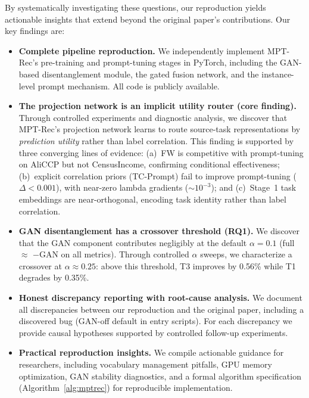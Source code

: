 \documentclass[review,anonymous]{acmart}
\begin{document}
By systematically investigating these questions, our reproduction yields
actionable insights that extend beyond the original paper's contributions. Our
key findings are:

\begin{itemize}
  \item \textbf{Complete pipeline reproduction.} We independently implement MPT-Rec's
    pre-training and prompt-tuning stages in PyTorch, including the GAN-based
    disentanglement module, the gated fusion network, and the instance-level
    prompt mechanism. All code is publicly available.

  \item \textbf{The projection network is an implicit utility router (core finding).}
    Through controlled experiments and diagnostic analysis, we discover that
    MPT-Rec's projection network learns to route source-task representations by
    \emph{prediction utility} rather than label correlation. This finding is
    supported by three converging lines of evidence: (a)~FW is competitive with
    prompt-tuning on AliCCP but not CensusIncome, confirming conditional
    effectiveness; (b)~explicit correlation priors (TC-Prompt) fail to improve
    prompt-tuning ($\Delta < 0.001$), with near-zero lambda gradients
    ($\sim10^{-3}$); and (c)~Stage~1 task embeddings are near-orthogonal,
    encoding task identity rather than label correlation.

  \item \textbf{GAN disentanglement has a crossover threshold (RQ1).} We discover
    that the GAN component contributes negligibly at the default $\alpha=0.1$
    (full $\approx$ $-$GAN on all metrics). Through controlled $\alpha$ sweeps,
    we characterize a crossover at $\alpha \approx 0.25$: above this threshold,
    T3 improves by 0.56\% while T1 degrades by 0.35\%.

  \item \textbf{Honest discrepancy reporting with root-cause analysis.} We document
    all discrepancies between our reproduction and the original paper, including
    a discovered bug (GAN-off default in entry scripts). For each discrepancy
    we provide causal hypotheses supported by controlled follow-up experiments.

  \item \textbf{Practical reproduction insights.} We compile actionable guidance
    for researchers, including vocabulary management pitfalls, GPU memory
    optimization, GAN stability diagnostics, and a formal algorithm specification
    (Algorithm~\ref{alg:mptrec}) for reproducible implementation.
\end{itemize}
\end{document}
